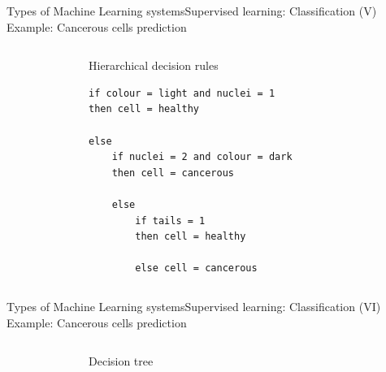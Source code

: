 \documentclass[10pt,compress]{beamer} %
\begin{document}
\begin{frame}[fragile]{Types of Machine Learning systems}{Supervised learning: Classification (V)}
	Example: Cancerous cells prediction
	\begin{columns}
			\begin{figure}
			\centering{
			\resizebox{0.9\textwidth}{!}{}}
			\end{figure}

	   		\begin{exampleblock}{Hierarchical decision rules}
	   		\begin{lstlisting}[firstnumber=1, xleftmargin=10pt]
if colour = light and nuclei = 1 
then cell = healthy   	
			            
else 
	if nuclei = 2 and colour = dark
	then cell = cancerous

	else 
		if tails = 1 
	    then cell = healthy

	    else cell = cancerous
	   		\end{lstlisting}
	   		\end{exampleblock}
	\end{columns}
\end{frame}

\begin{frame}[fragile]{Types of Machine Learning systems}{Supervised learning: Classification (VI)}
	Example: Cancerous cells prediction
	\begin{columns}
 	   \column{.10\textwidth}
 	   \column{.20\textwidth}
			\begin{figure}
			\centering{
			\resizebox{0.9\textwidth}{!}{}}
			\end{figure}

 	   \column{.50\textwidth}
	   		\begin{exampleblock}{Decision tree}
				\begin{figure}
				\centering{
				\resizebox{0.9\textwidth}{!}{}}
				\end{figure}
	   		\end{exampleblock}
 	   \column{.20\textwidth}
	\end{columns}
\end{frame}
\end{document}
